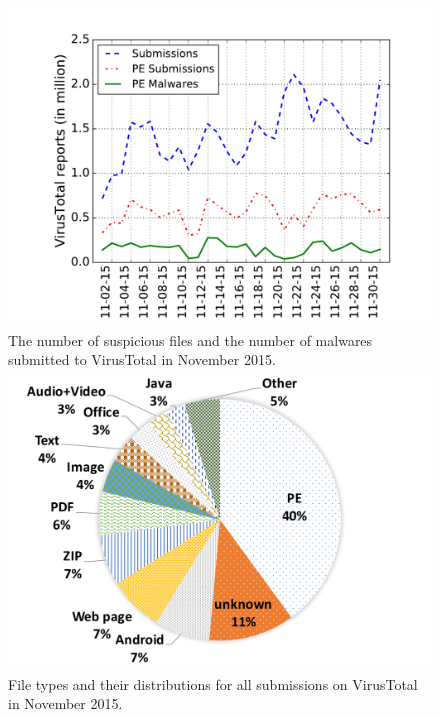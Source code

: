 \begin{figure}[!htb]
  \includegraphics[width=\linewidth]{figure/nov}
{
The number of suspicious files and the number of malwares submitted to VirusTotal in November 2015. 
}
\endminipage\hfill
{}
  \includegraphics[width=\linewidth]{figure/typePie}
  {
  File types and their distributions for all submissions on VirusTotal in November 2015.
  }
\endminipage\hfill
{}%

\end{figure}
